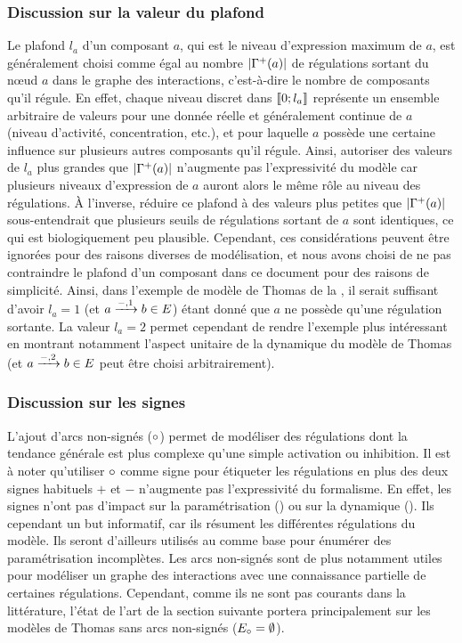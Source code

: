 \subsubsection*{Discussion sur la valeur du plafond}
Le plafond $l_a$ d'un composant $a$, qui est le niveau d'expression maximum de $a$,
est généralement choisi comme égal au nombre $|\Gamma^+(a)|$
de régulations sortant du nœud $a$ dans le graphe des interactions,
c'est-à-dire le nombre de composants qu'il régule.
En effet, chaque niveau discret dans $\mathopen{\llbracket}0\mathclose{};l_a\mathclose{\rrbracket}$ représente un ensemble arbitraire de valeurs
pour une donnée réelle et généralement continue de $a$ (niveau d'activité, concentration, etc.),
et pour laquelle $a$ possède une certaine influence sur plusieurs autres composants qu'il régule.
Ainsi, autoriser des valeurs de $l_a$ plus grandes que $|\Gamma^+(a)|$
n'augmente pas l'expressivité du modèle
car plusieurs niveaux d'expression de $a$ auront alors le même rôle au niveau des régulations.
À l'inverse, réduire ce plafond à des valeurs plus petites que $|\Gamma^+(a)|$
sous-entendrait que plusieurs seuils de régulations sortant de $a$ sont identiques,
ce qui est biologiquement peu plausible.
Cependant, ces considérations peuvent être ignorées pour des raisons diverses de modélisation,
et nous avons choisi de ne pas contraindre le plafond d'un composant dans ce document
pour des raisons de simplicité.
Ainsi, dans l'exemple de modèle de Thomas de la ,
il serait suffisant d'avoir $l_a = 1$ (et $a \xrightarrow{-, 1} b \in E$)
étant donné que $a$ ne possède qu'une régulation sortante.
La valeur $l_a = 2$ permet cependant de rendre l'exemple plus intéressant
en montrant notamment l'aspect unitaire de la dynamique du modèle de Thomas
(et $a \xrightarrow{-, 2} b \in E$ peut être choisi arbitrairement).

\subsubsection*{Discussion sur les signes}
L'ajout d'arcs non-signés ($\circ$) permet de modéliser des régulations dont la tendance générale
est plus complexe qu'une simple activation ou inhibition.
Il est à noter qu'utiliser $\circ$ comme signe pour étiqueter les régulations en plus
des deux signes habituels $+$ et $-$ n'augmente pas l'expressivité du formalisme.
En effet, les signes n'ont pas d'impact sur la paramétrisation ()
ou sur la dynamique ().
Ils cependant un but informatif, car ils résument les différentes régulations du modèle.
Ils seront d'ailleurs utilisés au 
comme base pour énumérer des paramétrisation incomplètes.
Les arcs non-signés sont de plus notamment utiles pour modéliser un graphe des interactions
avec une connaissance partielle de certaines régulations.
Cependant, comme ils ne sont pas courants dans la littérature,
l'état de l'art de la section suivante portera principalement
sur les modèles de Thomas sans arcs non-signés ($E_\circ = \emptyset$).

